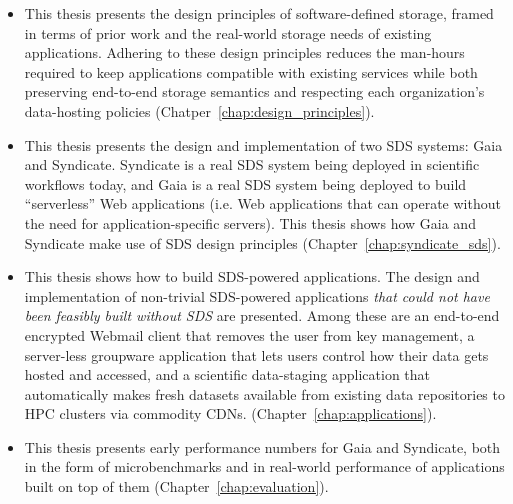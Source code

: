 \begin{itemize}

\item This thesis presents the design principles of software-defined storage, framed in
terms of prior work and the real-world storage needs of existing applications.
Adhering to these design principles reduces the man-hours required to keep applications compatible
with existing services while both preserving end-to-end storage semantics and
respecting each organization's data-hosting policies (Chatper~\ref{chap:design_principles}).

\item This thesis presents the design and implementation of two SDS systems: Gaia and
Syndicate.  Syndicate is a real SDS system being deployed in scientific
workflows today, and Gaia is a real SDS system being deployed to build
``serverless'' Web applications (i.e. Web applications that can operate
without the need for application-specific servers).
This thesis shows how Gaia and Syndicate make use of SDS design principles
(Chapter~\ref{chap:syndicate_sds}).

\item This thesis shows how to build SDS-powered applications.  The design and
implementation of non-trivial SDS-powered applications \emph{that could not
have been feasibly built without SDS} are presented.  Among these are an end-to-end encrypted
Webmail client that removes the user from key management, a server-less
groupware application that lets users control how their data gets hosted and
accessed, and a scientific data-staging application that
automatically makes fresh datasets available from existing data repositories to
HPC clusters via commodity CDNs.
(Chapter~\ref{chap:applications}).

\item This thesis presents early performance numbers for Gaia and Syndicate, both in the
form of microbenchmarks and in real-world performance of applications built on
top of them (Chapter~\ref{chap:evaluation}).

\end{itemize}

